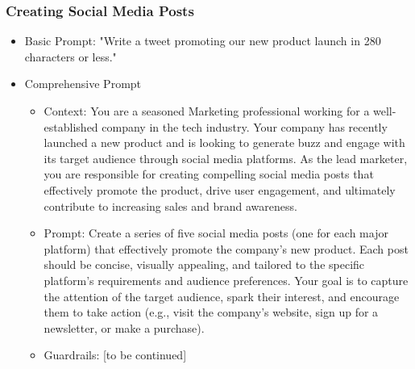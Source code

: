 \begin{frame}[fragile]\frametitle{Creating Social Media Posts}
\begin{itemize}
\item Basic Prompt: "Write a tweet promoting our new product launch in 280 characters or less."
\item Comprehensive Prompt
	\begin{itemize}
	\item Context: You are a seasoned Marketing professional working for a well-established company in the tech industry. Your company has recently launched a new product and is looking to generate buzz and engage with its target audience through social media platforms. As the lead marketer, you are responsible for creating compelling social media posts that effectively promote the product, drive user engagement, and ultimately contribute to increasing sales and brand awareness.
	\item Prompt: Create a series of five social media posts (one for each major platform) that effectively promote the company's new product. Each post should be concise, visually appealing, and tailored to the specific platform's requirements and audience preferences. Your goal is to capture the attention of the target audience, spark their interest, and encourage them to take action (e.g., visit the company's website, sign up for a newsletter, or make a purchase).
	\item Guardrails: [to be continued]
	\end{itemize}
\end{itemize}
\end{frame}

